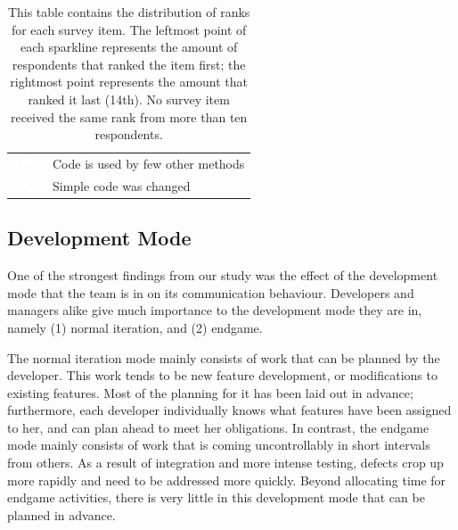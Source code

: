 \documentclass[12pt,oneside]{book}
\begin{document}
\begin{table}[t!]
\begin{tabular}{ll}
\vspace{-2pt}\includegraphics[height=10px, width=30px]{figures/sparkles/code-is-used-by-a-few-other-methods.pdf} & Code is used by few other methods\\ 
\vspace{-2pt}\includegraphics[height=10px, width=30px]{figures/sparkles/simple-code-was-changed.pdf} & Simple code was changed\\
\bottomrule
\end{tabular}
\vspace{-5pt}
\caption{This table contains the distribution of ranks for each survey item. The leftmost point of each sparkline represents the amount of respondents that ranked the item first; the rightmost point represents the amount that ranked it last (14th). No survey item received the same rank from more than ten respondents.}
\label{tab:sparkle}
\vspace{-20pt}
\end{table}




\subsection{Development Mode}

One of the strongest findings from our study was the effect of the development mode that the team is in on its communication behaviour. Developers and managers alike give much importance to the development mode they are in, namely (1) normal iteration, and (2) endgame.

The normal iteration mode mainly consists of work that can be planned by the developer. This work tends to be new feature development, or modifications to existing features. Most of the planning for it has been laid out in advance; furthermore, each developer individually knows what features have been assigned to her, and can plan ahead to meet her obligations.
In contrast, the endgame mode mainly consists of work that is coming uncontrollably in short intervals from others. As a result of integration and more intense testing, defects crop up more rapidly and need to be addressed more quickly. Beyond allocating time for endgame activities, there is very little in this development mode that can be planned in advance.
\end{document}
